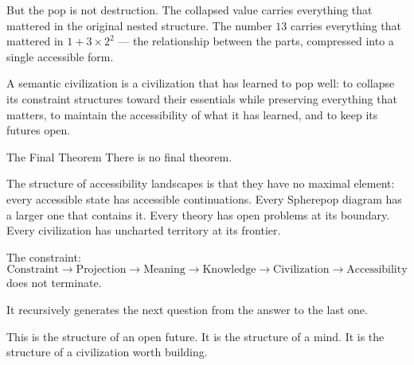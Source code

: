 But the pop is not destruction. The collapsed value carries everything
that mattered in the original nested structure. The number $13$ carries
everything that mattered in $1 + 3 \times 2^2$ — the relationship
between the parts, compressed into a single accessible form.

A semantic civilization is a civilization that has learned to pop well:
to collapse its constraint structures toward their essentials while
preserving everything that matters, to maintain the accessibility of
what it has learned, and to keep its futures open.

\begin{namedthm}{The Final Theorem}
  There is no final theorem.

  The structure of accessibility landscapes is that they have no
  maximal element: every accessible state has accessible continuations.
  Every Spherepop diagram has a larger one that contains it.
  Every theory has open problems at its boundary.
  Every civilization has uncharted territory at its frontier.

  The constraint:
  \[
    \text{Constraint} \to \text{Projection} \to \text{Meaning}
    \to \text{Knowledge} \to \text{Civilization} \to \text{Accessibility}
  \]
  does not terminate.

  It recursively generates the next question from the answer to the last one.

  This is the structure of an open future. It is the structure of a mind.
  It is the structure of a civilization worth building.
\end{namedthm}

